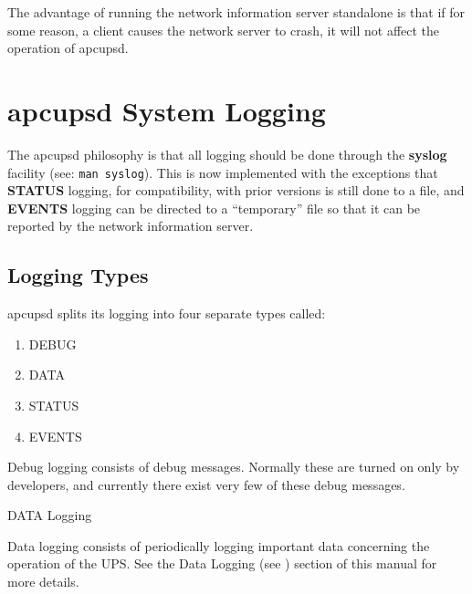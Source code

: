 {{{{{{{{{The advantage of running the network information server standalone is that if
for some reason, a client causes the network server to crash, it will not
affect the operation of apcupsd. 

\label{apcupsd-System-Logging}

\section*{apcupsd System Logging}

\label{index-Logging_002c-System-166}
\label{index-System-Logging-167}
The apcupsd philosophy is that all logging should be done through the {\bf
syslog} facility (see: {\tt man syslog}). This is now implemented with the
exceptions that {\bf STATUS} logging, for compatibility, with prior versions
is still done to a file, and {\bf EVENTS} logging can be directed to a
``temporary'' file so that it can be reported by the network information
server. 

\label{Logging-Types}

\subsection*{Logging Types}

\label{index-Logging_002c-types-168}
apcupsd splits its logging into four separate types called:  

\begin{enumerate}
\item DEBUG  
\item DATA  
\item STATUS  
\item EVENTS  
   \end{enumerate}

Debug logging consists of debug messages. Normally these are turned on only by
developers, and currently there exist very few of these debug messages. 

\small{DATA Logging}

Data logging consists of periodically logging important data concerning the
operation of the UPS. See the Data Logging (see 
) section of this manual for more
details. 

}}}}}}}}}
